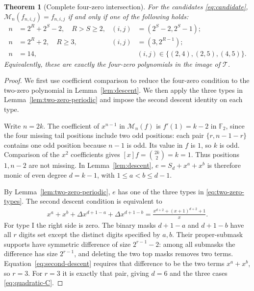 \documentclass[11pt]{article}
\newtheorem{theorem}[proposition]{Theorem}
\theoremstyle{definition}
\theoremstyle{remark}
\begin{document}
\begin{theorem}[Complete four-zero intersection]\label{thm:quadratic}
For the candidates \eqref{eq:candidate},
$\mathcal M_n(f_{n,i,j})=f_{n,i,j}$ if and only if one of the
following holds:
\begin{align}
 n&=2^R+2^S-2,\quad R>S\ge2,&
 (i,j)&=(2^S-2,2^S-1);\label{eq:quadratic-A}\\
 n&=2^R+2,\quad R\ge3,&
 (i,j)&=(3,2^{R-1});\label{eq:quadratic-B}\\
 n&=14,&&
 (i,j)\in\{(2,4),(2,5),(4,5)\}.\label{eq:quadratic-C}
\end{align}
Equivalently, these are exactly the four-zero polynomials in the
image of $\mathcal T$.
\end{theorem}
\begin{proof}
We first use coefficient comparison to reduce the four-zero condition to
the two-zero polynomial in Lemma~\ref{lem:descent}. We then apply the
three types in Lemma~\ref{lem:two-zero-periodic} and impose the second
descent identity on each type.

Write $n=2k$. The coefficient of $x^{n-1}$ in
$\mathcal M_n(f)$ is $f'(1)=k-2$ in $\mathbb F_2$, since the
four missing tail positions include two odd positions: each pair
$\{r,n-1-r\}$ contains one odd position because $n-1$ is odd.
Its value in $f$ is $1$, so $k$ is odd. Comparison of the
$x^2$ coefficients gives $[x]f=\binom{2k}{2}=k=1$.
Thus positions $1,n-2$ are not missing. In Lemma~\ref{lem:descent},
$e=S_d+x^a+x^b$ is therefore monic of even degree $d=k-1$,
with $1\le a<b\le d-1$.

By Lemma~\ref{lem:two-zero-periodic}, $e$ has one of the three types
in \eqref{eq:two-zero-types}. The second descent condition is
equivalent to
\begin{equation}\label{eq:second-descent}
\begin{split}
 x^a+x^b+\Delta x^{d+1-a}+\Delta x^{d+1-b}
 =\frac{x^{d+2}+(x+1)^{d+2}+1}{x}.
\end{split}
\end{equation}
For type I the right side is zero. The binary masks $d+1-a$ and
$d+1-b$ have all $r$ digits set except the distinct digits specified
by $a,b$. Their proper-submask supports have symmetric difference
of size $2^{r-1}-2$: among all submasks the difference has size
$2^{r-1}$, and deleting the two top masks removes two terms.
Equation~\eqref{eq:second-descent} requires that difference to be
the two terms $x^a+x^b$, so $r=3$. For $r=3$ it is exactly that
pair, giving $d=6$ and the three cases \eqref{eq:quadratic-C}.


\end{proof}
\end{document}

